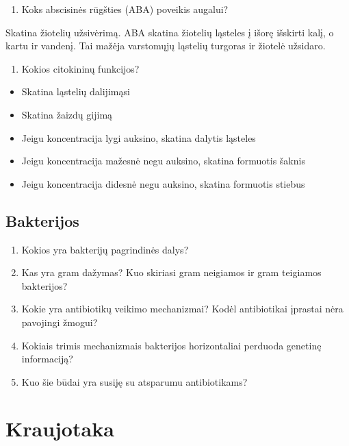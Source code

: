 \documentclass[]{book}
\providecommand{\tightlist}{%
  \setlength{\itemsep}{0pt}\setlength{\parskip}{0pt}}
\begin{document}
\begin{enumerate}
\def\labelenumi{\arabic{enumi}.}
\setcounter{enumi}{5}
\tightlist
\item
  Koks abscisinės rūgšties (ABA) poveikis augalui?
\end{enumerate}

Skatina žiotelių užsivėrimą. ABA skatina žiotelių ląsteles į išorę išskirti kalį, o kartu ir vandenį. Tai mažėja varstomųjų ląstelių turgoras ir žiotelė užsidaro.

\begin{enumerate}
\def\labelenumi{\arabic{enumi}.}
\setcounter{enumi}{6}
\tightlist
\item
  Kokios citokininų funkcijos?
\end{enumerate}

\begin{itemize}
\tightlist
\item
  Skatina ląstelių dalijimąsi
\item
  Skatina žaizdų gijimą
\item
  Jeigu koncentracija lygi auksino, skatina dalytis ląsteles
\item
  Jeigu koncentracija mažesnė negu auksino, skatina formuotis šaknis
\item
  Jeigu koncentracija didesnė negu auksino, skatina formuotis stiebus
\end{itemize}

\hypertarget{bakterijos-1}{%
\section{Bakterijos}\label{bakterijos-1}}

\begin{enumerate}
\def\labelenumi{\arabic{enumi}.}
\tightlist
\item
  Kokios yra bakterijų pagrindinės dalys?
\item
  Kas yra gram dažymas? Kuo skiriasi gram neigiamos ir gram teigiamos bakterijos?
\item
  Kokie yra antibiotikų veikimo mechanizmai? Kodėl antibiotikai įprastai nėra pavojingi žmogui?
\item
  Kokiais trimis mechanizmais bakterijos horizontaliai perduoda genetinę informaciją?
\item
  Kuo šie būdai yra susiję su atsparumu antibiotikams?
\end{enumerate}

\hypertarget{kraujotaka}{%
\chapter{Kraujotaka}\label{kraujotaka}}
\end{document}
